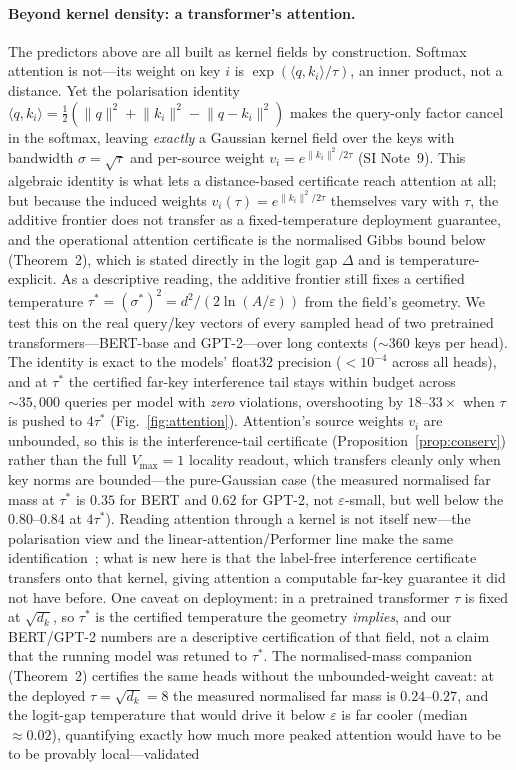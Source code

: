 \documentclass[10pt,twocolumn]{article}
\newcommand{\sstar}{\sigma^{*}}
\begin{document}
\paragraph{Beyond kernel density: a transformer's attention.} The predictors above are all built as kernel fields by construction. Softmax attention is not---its weight on key $i$ is $\exp(\langle q,k_i\rangle/\tau)$, an inner product, not a distance. Yet the polarisation identity $\langle q,k_i\rangle=\tfrac12(\lVert q\rVert^2+\lVert k_i\rVert^2-\lVert q-k_i\rVert^2)$ makes the query-only factor cancel in the softmax, leaving \emph{exactly} a Gaussian kernel field over the keys with bandwidth $\sigma=\sqrt{\tau}$ and per-source weight $v_i=e^{\lVert k_i\rVert^2/2\tau}$ (SI Note~9). This algebraic identity is what lets a distance-based certificate reach attention at all; but because the induced weights $v_i(\tau)=e^{\lVert k_i\rVert^2/2\tau}$ themselves vary with $\tau$, the additive frontier does not transfer as a fixed-temperature deployment guarantee, and the operational attention certificate is the normalised Gibbs bound below (Theorem~2), which is stated directly in the logit gap $\Delta$ and is temperature-explicit. As a descriptive reading, the additive frontier still fixes a certified temperature $\tau^*=(\sstar)^2=d^2/(2\ln(A/\varepsilon))$ from the field's geometry. We test this on the real query/key vectors of every sampled head of two pretrained transformers---BERT-base and GPT-2---over long contexts ($\sim\!360$ keys per head). The identity is exact to the models' float32 precision ($<10^{-4}$ across all heads), and at $\tau^*$ the certified far-key interference tail stays within budget across $\sim\!35{,}000$ queries per model with \emph{zero} violations, overshooting by $18$--$33\times$ when $\tau$ is pushed to $4\tau^*$ (Fig.~\ref{fig:attention}). Attention's source weights $v_i$ are unbounded, so this is the interference-tail certificate (Proposition~\ref{prop:conserv}) rather than the full $V_{\max}=1$ locality readout, which transfers cleanly only when key norms are bounded---the pure-Gaussian case (the measured normalised far mass at $\tau^*$ is $0.35$ for BERT and $0.62$ for GPT-2, not $\varepsilon$-small, but well below the $0.80$--$0.84$ at $4\tau^*$). Reading attention through a kernel is not itself new---the polarisation view and the linear-attention/Performer line make the same identification~\cite{tsai2019,choromanski2021}; what is new here is that the label-free interference certificate transfers onto that kernel, giving attention a computable far-key guarantee it did not have before. One caveat on deployment: in a pretrained transformer $\tau$ is fixed at $\sqrt{d_k}$, so $\tau^*$ is the certified temperature the geometry \emph{implies}, and our BERT/GPT-2 numbers are a descriptive certification of that field, not a claim that the running model was retuned to $\tau^*$. The normalised-mass companion (Theorem~2) certifies the same heads without the unbounded-weight caveat: at the deployed $\tau=\sqrt{d_k}=8$ the measured normalised far mass is $0.24$--$0.27$, and the logit-gap temperature that would drive it below $\varepsilon$ is far cooler (median $\approx0.02$), quantifying exactly how much more peaked attention would have to be to be provably local---validated 
\end{document}
